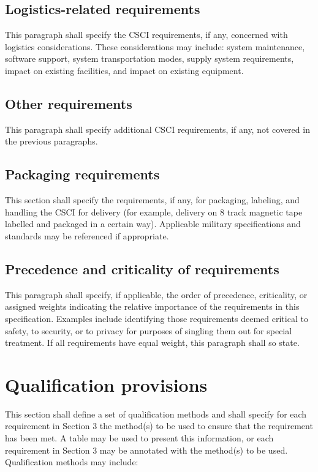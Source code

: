 \subsection{Logistics-related requirements}

This paragraph shall specify the CSCI requirements, if any, concerned
with logistics considerations. These considerations may include: system
maintenance, software support, system transportation modes, supply
system requirements, impact on existing facilities, and impact on
existing equipment.

\subsection{Other requirements}

This paragraph shall specify additional CSCI requirements, if any, not
covered in the previous paragraphs.

\subsection{Packaging requirements}

This section shall specify the requirements, if any, for packaging,
labeling, and handling the CSCI for delivery (for example, delivery on 8
track magnetic tape labelled and packaged in a certain way). Applicable
military specifications and standards may be referenced if appropriate.

\subsection{Precedence and criticality of requirements}

This paragraph shall specify, if applicable, the order of precedence,
criticality, or assigned weights indicating the relative importance of
the requirements in this specification. Examples include identifying
those requirements deemed critical to safety, to security, or to privacy
for purposes of singling them out for special treatment. If all
requirements have equal weight, this paragraph shall so state.

\section{Qualification provisions}

This section shall define a set of qualification methods and shall
specify for each requirement in Section 3 the method(s) to be used to
ensure that the requirement has been met. A table may be used to present
this information, or each requirement in Section 3 may be annotated with
the method(s) to be used. Qualification methods may include:

